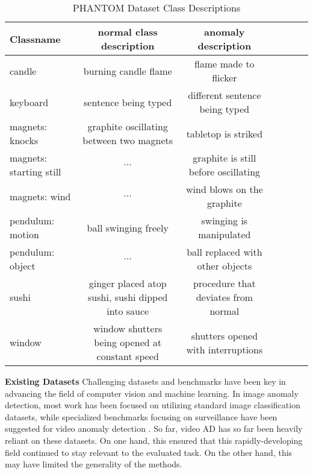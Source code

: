 \documentclass{article}
\begin{document}
\begin{table*}[ht!]
  \centering
  \label{tab:phantom_desc}

    \begin{tabular}{lcccccc}
    \toprule      

Classname	&	normal class description 	&	anomaly description		\\
\midrule						
candle	&	burning candle flame	&	flame made to flicker		\\
keyboard	&	sentence being typed	&	different sentence being typed		\\
magnets: knocks	&	graphite oscillating 
between two magnets	&	tabletop is striked		\\
magnets: starting still	&	$\ldots$	&	graphite is still before 
oscillating		\\
magnets: wind	&	$\ldots$	&	wind blows on the graphite		\\
pendulum: motion	&	ball swinging freely	&	swinging is manipulated		\\
pendulum: object	&	$\ldots$	&	ball replaced with other objects		\\
sushi	&	ginger placed atop sushi,
 sushi dipped into sauce	&	 procedure that 
deviates from normal		\\
window	&	window shutters being 
opened at constant speed	&	shutters opened with interruptions		\\
	 \bottomrule
    \end{tabular}
    \caption{PHANTOM Dataset Class Descriptions}
\end{table*}

\textbf{Existing Datasets}
Challenging datasets and benchmarks have been key in advancing the field of computer vision and machine learning. In image anomaly detection, most work has been focused on utilizing standard image classification datasets, while specialized benchmarks focusing on surveillance have been suggested for video anomaly detection \cite{sultani2018real, pranav2020day, rodrigues2020multi, wu2020not}. So far, video AD has so far been heavily reliant on these datasets. On one hand, this ensured that this rapidly-developing field continued to stay relevant to the evaluated task. On the other hand, this may have limited the generality of the methods.
\end{document}
